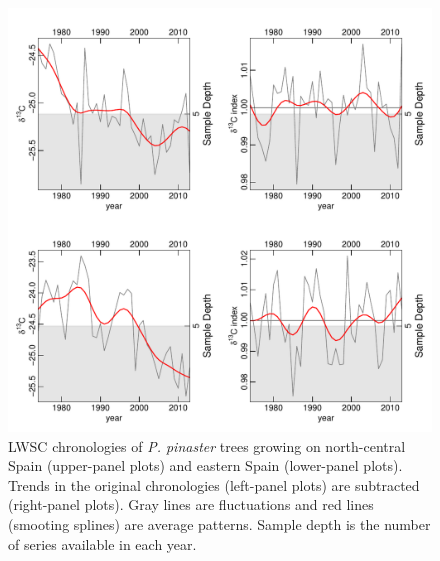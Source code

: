 \documentclass[review,authoryear]{elsarticle}
\begin{document}
\clearpage
\begin{figure}\centering
\includegraphics[scale=0.7,trim=20mm 0mm 20mm 0mm]{ideltas} 
\caption{\acrlong{LWSC} chronologies of \textit{P. pinaster} trees
  growing on north-central Spain (upper-panel plots) and eastern Spain
  (lower-panel plots). Trends in the original chronologies (left-panel
  plots) are subtracted (right-panel plots). Gray lines are
  fluctuations and red lines (smooting splines) are average
  patterns. Sample depth is the number of series available in each
  year.}
\label{fig:LWSC} 
\end{figure}
\end{document}
